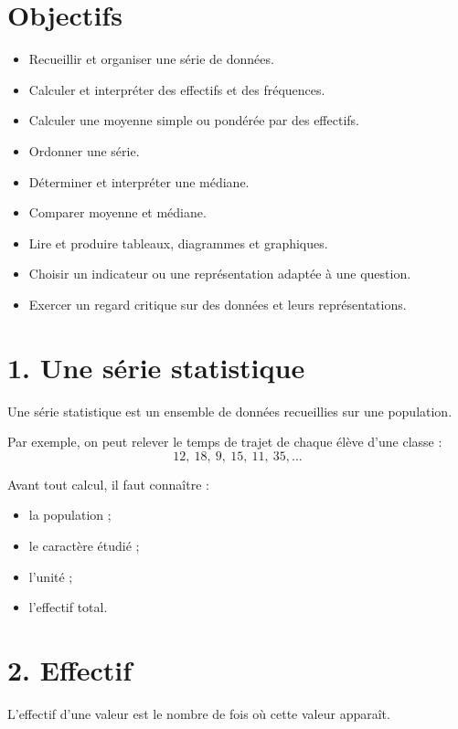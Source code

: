 
\section{Objectifs}

\begin{itemize}
\item Recueillir et organiser une série de données.
\item Calculer et interpréter des effectifs et des fréquences.
\item Calculer une moyenne simple ou pondérée par des effectifs.
\item Ordonner une série.
\item Déterminer et interpréter une médiane.
\item Comparer moyenne et médiane.
\item Lire et produire tableaux, diagrammes et graphiques.
\item Choisir un indicateur ou une représentation adaptée à une question.
\item Exercer un regard critique sur des données et leurs représentations.
\end{itemize}

\section{1. Une série statistique}

Une série statistique est un ensemble de données recueillies sur une population.

Par exemple, on peut relever le temps de trajet de chaque élève d'une classe :
\[
12,\ 18,\ 9,\ 15,\ 11,\ 35,\ldots
\]

Avant tout calcul, il faut connaître :
\begin{itemize}
\item la population ;
\item le caractère étudié ;
\item l'unité ;
\item l'effectif total.
\end{itemize}

\section{2. Effectif}

L'effectif d'une valeur est le nombre de fois où cette valeur apparaît.

